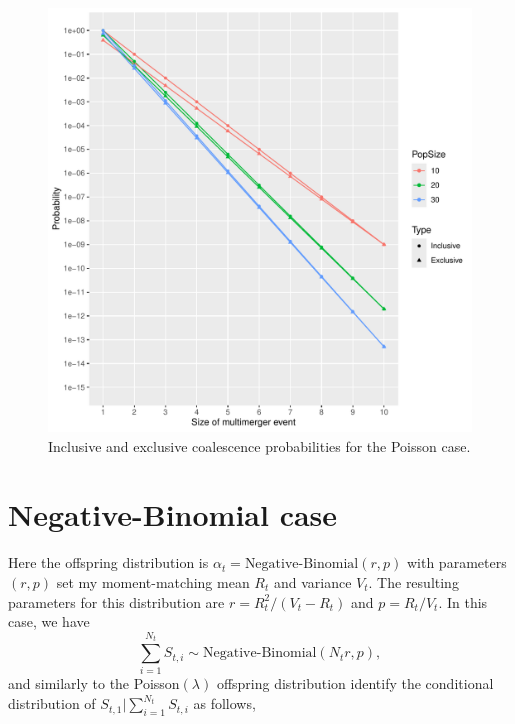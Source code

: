 \documentclass{article}
\begin{document}
\begin{figure}[!t]
\begin{center}
\includegraphics[width=15cm]{../run/figurePois.pdf}
\end{center}
\caption{Inclusive and exclusive coalescence probabilities for the Poisson case.
\label{fig:pois}}
\end{figure}

\section{Negative-Binomial case}

Here the offspring distribution is $\alpha_t=\text{Negative-Binomial}(r,p)$ with parameters $(r,p)$ set my moment-matching mean $R_t$ and variance $V_t$.
The resulting parameters for this distribution are $r=R_t^2/(V_t-R_t)$ and $p=R_t/V_t$.
In this case, we have
	\begin{equation}
		\sum_{i=1}^{N_t} S_{t,i} \sim \text{Negative-Binomial}(N_t r,p),
	\end{equation}
and similarly to the Poisson$(\lambda)$ offspring distribution identify the conditional distribution of $S_{t,1} | \sum_{i=1}^{N_t} S_{t,i}$ as follows,
\end{document}
